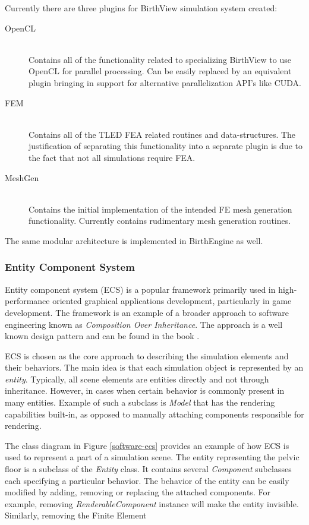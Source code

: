 Currently there are three plugins for BirthView simulation system created:


\begin{description}
  \item[OpenCL] \hfill \\
  Contains all of the functionality related to specializing BirthView to use OpenCL for parallel processing. Can be easily replaced by an equivalent plugin bringing in support for alternative parallelization API's like CUDA.
  \item[FEM] \hfill \\
  Contains all of the TLED FEA related routines and data-structures. The justification of separating this functionality into a separate plugin is due to the fact that not all simulations require FEA.
  \item[MeshGen] \hfill \\
  Contains the initial implementation of the intended FE mesh generation functionality. Currently contains rudimentary mesh generation routines.
\end{description}

The same modular architecture is implemented in BirthEngine as well.

\subsubsection{Entity Component System}

Entity component system (ECS) is a popular framework primarily used in high-performance oriented graphical applications development, particularly in game development. The framework is an example of a broader approach to software engineering known as \textit{Composition Over Inheritance}. The approach is a well known design pattern and can be found in the book \citep{Freeman:2004:HFD:1076324}.

ECS is chosen as the core approach to describing the simulation elements and their behaviors. The main idea is that each simulation object is represented by an \textit{entity}. Typically, all scene elements are entities directly and not through inheritance. However, in cases when certain behavior is commonly present in many entities. Example of such a subclass is \textit{Model} that has the rendering capabilities built-in, as opposed to manually attaching components responsible for rendering.

The class diagram in Figure \ref{software-ecs} provides an example of how ECS is used to represent a part of a simulation scene. The entity representing the pelvic floor is a subclass of the \textit{Entity} class. It contains several \textit{Component} subclasses each specifying a particular behavior. The behavior of the entity can be easily modified by adding, removing or replacing the attached components. For example, removing \textit{RenderableComponent} instance will make the entity invisible. Similarly, removing the Finite Element

